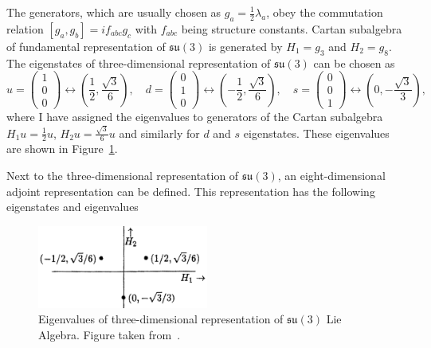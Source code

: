 The generators, which are usually chosen as $g_a = \frac{1}{2} \lambda_a$, obey the
commutation relation $[g_a,g_b]=if_{abc}g_c$ with $f_{abc}$ being structure
constants. Cartan subalgebra of fundamental representation of $\mathfrak{su}(3)$
is generated by $H_1=g_3$ and $H_2=g_8$. The eigenstates of three-dimensional
representation of $\mathfrak{su}(3)$ can be chosen as
\small
\begin{equation}
  u = \begin{pmatrix} 1 \\ 0 \\ 0 \end{pmatrix} \leftrightarrow \left(
    \frac{1}{2}, \frac{\sqrt{3}}{6} \right), \quad
  d = \begin{pmatrix} 0 \\ 1 \\ 0 \end{pmatrix} \leftrightarrow \left(
    - \frac{1}{2}, \frac{\sqrt{3}}{6} \right), \quad
  s = \begin{pmatrix} 0 \\ 0 \\ 1 \end{pmatrix} \leftrightarrow \left(
    0, - \frac{\sqrt{3}}{3} \right), \quad
  \label{eq:RepresentLie3}
\end{equation}
\normalsize
where I have assigned the eigenvalues to generators of the Cartan subalgebra 
$H_1 u = \frac{1}{2} u$, $H_2 u = \frac{\sqrt{3}}{6} u$ and similarly
for $d$ and $s$ eigenstates. 
These eigenvalues are shown in Figure~\ref{fig:QuarkTriplet}. 

Next to the three-dimensional representation of $\mathfrak{su}(3)$, an
eight-dimensional adjoint representation can be defined.
This representation has the following eigenstates and eigenvalues

\begin{figure}[t]
  \centering
  \includegraphics[width=0.5\textwidth]{Chapter1/Quark-triplet.png} 
  \caption[Eigenvalues of three-dimensional representation of $\mathfrak{su}(3)$
          Lie Algebra.]
          {Eigenvalues of three-dimensional representation of $\mathfrak{su}(3)$ Lie
          Algebra. Figure taken from~\cite{LieAlgebrasForParticlePhysicists}.}
  \label{fig:QuarkTriplet}
\end{figure}

